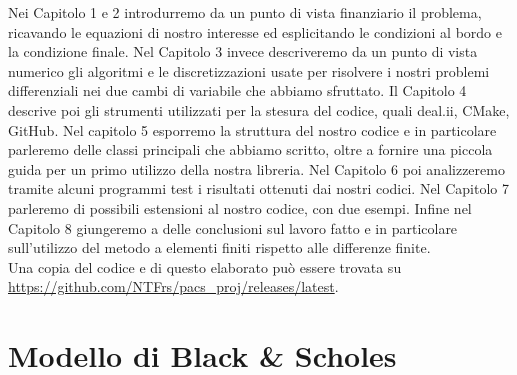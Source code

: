 \documentclass[a4paper,10pt]{report}
\theoremstyle{plain}
\theoremstyle{definition}
\theoremstyle{remark}
\begin{document}
Nei Capitolo 1 e 2 introdurremo da un punto di vista finanziario il problema, ricavando le equazioni di nostro interesse ed esplicitando le condizioni al bordo e la condizione finale. Nel Capitolo 3 invece descriveremo da un punto di vista numerico gli algoritmi e le discretizzazioni usate per risolvere i nostri problemi differenziali nei due cambi di variabile che abbiamo sfruttato. Il Capitolo 4 descrive poi gli strumenti utilizzati per la stesura del codice, quali \textsf{deal.ii}, \textsf{CMake}, GitHub. Nel capitolo 5 esporremo la struttura del nostro codice e in particolare parleremo delle classi principali che abbiamo scritto, oltre a fornire una piccola guida per un primo utilizzo della nostra libreria. Nel Capitolo 6 poi analizzeremo tramite alcuni programmi test i risultati ottenuti dai nostri codici. Nel Capitolo 7 parleremo di possibili estensioni al nostro codice, con due esempi. Infine nel Capitolo 8 giungeremo a delle conclusioni sul lavoro fatto e in particolare sull'utilizzo del metodo a elementi finiti rispetto alle differenze finite.\\

Una copia del codice e di questo elaborato pu\`o essere trovata su \url{https://github.com/NTFrs/pacs_proj/releases/latest}.

\chapter{Modello di Black \& Scholes}
\end{document}
